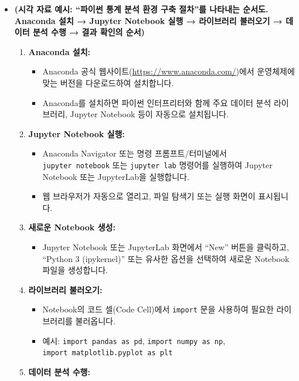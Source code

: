 \documentclass[
  letterpaper,
]{book}
\providecommand{\tightlist}{%
  \setlength{\itemsep}{0pt}\setlength{\parskip}{0pt}}
\begin{document}
\begin{itemize}
\item
  \textbf{(시각 자료 예시: ``파이썬 통계 분석 환경 구축 절차''를
  나타내는 순서도. Anaconda 설치 → Jupyter Notebook 실행 → 라이브러리
  불러오기 → 데이터 분석 수행 → 결과 확인의 순서)}

  \begin{enumerate}
  \def\labelenumi{\arabic{enumi}.}
  \tightlist
  \item
    \textbf{Anaconda 설치:}

    \begin{itemize}
    \tightlist
    \item
      Anaconda 공식 웹사이트(\url{https://www.anaconda.com/})에서
      운영체제에 맞는 버전을 다운로드하여 설치합니다.
    \item
      Anaconda를 설치하면 파이썬 인터프리터와 함께 주요 데이터 분석
      라이브러리, Jupyter Notebook 등이 자동으로 설치됩니다.
    \end{itemize}
  \item
    \textbf{Jupyter Notebook 실행:}

    \begin{itemize}
    \tightlist
    \item
      Anaconda Navigator 또는 명령 프롬프트/터미널에서
      \texttt{jupyter\ notebook} 또는 \texttt{jupyter\ lab} 명령어를
      실행하여 Jupyter Notebook 또는 JupyterLab을 실행합니다.
    \item
      웹 브라우저가 자동으로 열리고, 파일 탐색기 또는 실행 화면이
      표시됩니다.
    \end{itemize}
  \item
    \textbf{새로운 Notebook 생성:}

    \begin{itemize}
    \tightlist
    \item
      Jupyter Notebook 또는 JupyterLab 화면에서 ``New'' 버튼을 클릭하고,
      ``Python 3 (ipykernel)'' 또는 유사한 옵션을 선택하여 새로운
      Notebook 파일을 생성합니다.
    \end{itemize}
  \item
    \textbf{라이브러리 불러오기:}

    \begin{itemize}
    \tightlist
    \item
      Notebook의 코드 셀(Code Cell)에서 \texttt{import} 문을 사용하여
      필요한 라이브러리를 불러옵니다.
    \item
      예시: \texttt{import\ pandas\ as\ pd},
      \texttt{import\ numpy\ as\ np},
      \texttt{import\ matplotlib.pyplot\ as\ plt}
    \end{itemize}
  \item
    \textbf{데이터 분석 수행:}


\end{enumerate}
\end{itemize}
\end{document}
